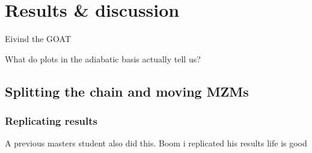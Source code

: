 \chapter{Results \& discussion}
Eivind the GOAT

What do plots in the adiabatic basis actually tell us?

\section{Splitting the chain and moving MZMs}

\subsection{Replicating results}
A previous masters student also did this. Boom i replicated his results life is good







